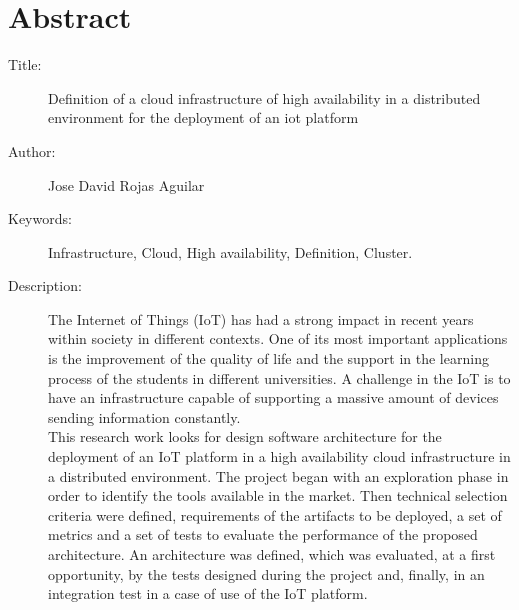 \chapter*{Abstract}

\footnotesize{
\begin{description}
  \item[Title:] Definition of a cloud infrastructure of high availability in a distributed environment for the deployment of an iot platform
  \item[Author:] Jose David Rojas Aguilar
  \item[Keywords:] Infrastructure, Cloud, High availability, Definition, Cluster.
  \item[Description:] The Internet of Things (IoT) has had a strong impact in recent years within society in different contexts. One of its most important applications is the improvement of the quality of life and the support in the learning process of the students in different universities. A challenge in the IoT is to have an infrastructure capable of supporting a massive amount of devices sending information constantly. \\
  
  This research work looks for design software architecture for the deployment of an IoT platform in a high availability cloud infrastructure in a distributed environment. The project began with an exploration phase in order to identify the tools available in the market. Then technical selection criteria were defined, requirements of the artifacts to be deployed, a set of metrics and a set of tests to evaluate the performance of the proposed architecture. An architecture was defined, which was evaluated, at a first opportunity, by the tests designed during the project and, finally, in an integration test in a case of use of the IoT platform.
\end{description}}\normalsize
